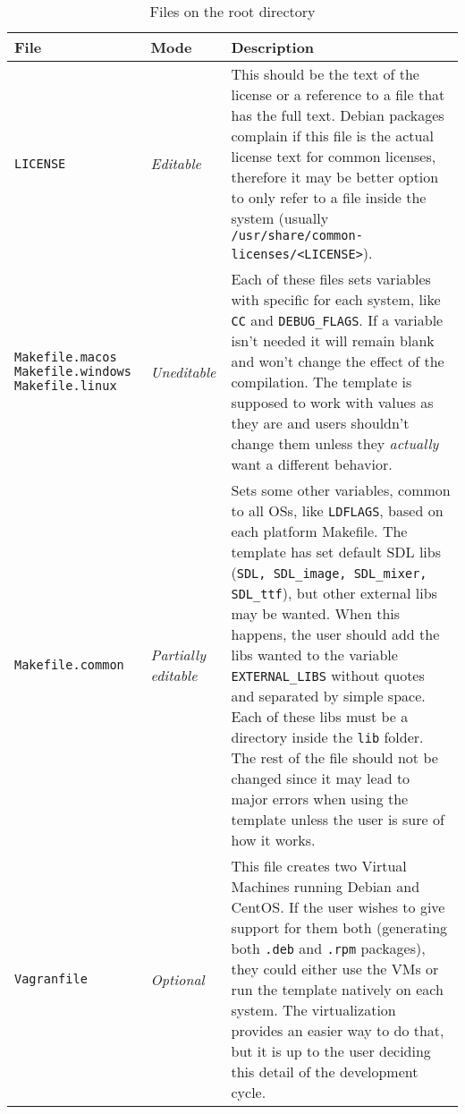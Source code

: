 \begin{longtable}{p{3cm}p{2cm}p{10cm}}

\caption{Files on the root directory}\label{tab:files_root_dir}\\
\toprule
\textbf{File} & \textbf{Mode} & \textbf{Description} \\
\midrule
\endhead



\texttt{LICENSE} & \emph{Editable} & This should be the text of the license or a reference to a file that has the full text. Debian packages complain if this file is the actual license text for common licenses, therefore it may be better option to only refer to a file inside the system (usually \texttt{/usr/share/common-licenses/<LICENSE>}). \\ \hline
\texttt{Makefile.macos} \texttt{Makefile.windows} \texttt{Makefile.linux} & \emph{Uneditable} & Each of these files sets variables with specific for each system, like \texttt{CC} and \texttt{DEBUG\_FLAGS}. If a variable isn't needed it will remain blank and won't change the effect of the compilation. The template is supposed to work with values as they are and users shouldn't change them unless they \emph{actually} want a different behavior. \\ \hline
\texttt{Makefile.common} & \emph{Partially editable} & Sets some other variables, common to all OSs, like \texttt{LDFLAGS}, based on each platform Makefile. The template has set default SDL libs (\texttt{SDL, SDL\_image, SDL\_mixer, SDL\_ttf}), but other external libs may be wanted. When this happens, the user should add the libs wanted to the variable \texttt{EXTERNAL\_LIBS} without quotes and separated by simple space. Each of these libs must be a directory inside the \texttt{lib} folder. The rest of the file should not be changed since it may lead to major errors when using the template unless the user is sure of how it works. \\ \hline
\texttt{Vagranfile} & \emph{Optional} & This file creates two Virtual Machines running Debian and CentOS. If the user wishes to give support for them both (generating both \texttt{.deb} and \texttt{.rpm} packages), they could either use the VMs or run the template natively on each system. The virtualization provides an easier way to do that, but it is up to the user deciding this detail of the development cycle. \\ \hline

\end{longtable}
